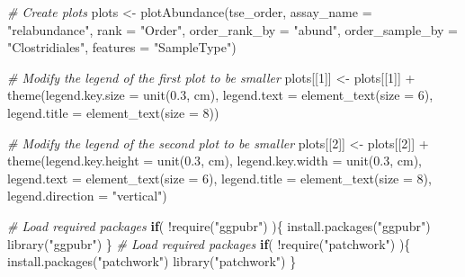 \documentclass[
]{book}
\newenvironment{Shaded}{\begin{snugshade}}{\end{snugshade}}
\newcommand{\AttributeTok}[1]{\textcolor[rgb]{0.77,0.63,0.00}{#1}}
\newcommand{\CommentTok}[1]{\textcolor[rgb]{0.56,0.35,0.01}{\textit{#1}}}
\newcommand{\ControlFlowTok}[1]{\textcolor[rgb]{0.13,0.29,0.53}{\textbf{#1}}}
\newcommand{\DecValTok}[1]{\textcolor[rgb]{0.00,0.00,0.81}{#1}}
\newcommand{\FloatTok}[1]{\textcolor[rgb]{0.00,0.00,0.81}{#1}}
\newcommand{\FunctionTok}[1]{\textcolor[rgb]{0.00,0.00,0.00}{#1}}
\newcommand{\NormalTok}[1]{#1}
\newcommand{\OtherTok}[1]{\textcolor[rgb]{0.56,0.35,0.01}{#1}}
\newcommand{\SpecialCharTok}[1]{\textcolor[rgb]{0.00,0.00,0.00}{#1}}
\newcommand{\StringTok}[1]{\textcolor[rgb]{0.31,0.60,0.02}{#1}}
\begin{document}
\begin{Shaded}
\begin{Highlighting}[]
\CommentTok{\# Create plots}
\NormalTok{plots }\OtherTok{\textless{}{-}} \FunctionTok{plotAbundance}\NormalTok{(tse\_order, }\AttributeTok{assay\_name =} \StringTok{"relabundance"}\NormalTok{, }\AttributeTok{rank =} \StringTok{"Order"}\NormalTok{,}
                       \AttributeTok{order\_rank\_by =} \StringTok{"abund"}\NormalTok{, }\AttributeTok{order\_sample\_by =} \StringTok{"Clostridiales"}\NormalTok{,}
                       \AttributeTok{features =} \StringTok{"SampleType"}\NormalTok{)}

\CommentTok{\# Modify the legend of the first plot to be smaller }
\NormalTok{plots[[}\DecValTok{1}\NormalTok{]] }\OtherTok{\textless{}{-}}\NormalTok{ plots[[}\DecValTok{1}\NormalTok{]] }\SpecialCharTok{+}
    \FunctionTok{theme}\NormalTok{(}\AttributeTok{legend.key.size =} \FunctionTok{unit}\NormalTok{(}\FloatTok{0.3}\NormalTok{, }\StringTok{\textquotesingle{}cm\textquotesingle{}}\NormalTok{),}
          \AttributeTok{legend.text =} \FunctionTok{element\_text}\NormalTok{(}\AttributeTok{size =} \DecValTok{6}\NormalTok{),}
          \AttributeTok{legend.title =} \FunctionTok{element\_text}\NormalTok{(}\AttributeTok{size =} \DecValTok{8}\NormalTok{))}

\CommentTok{\# Modify the legend of the second plot to be smaller }
\NormalTok{plots[[}\DecValTok{2}\NormalTok{]] }\OtherTok{\textless{}{-}}\NormalTok{ plots[[}\DecValTok{2}\NormalTok{]] }\SpecialCharTok{+}
    \FunctionTok{theme}\NormalTok{(}\AttributeTok{legend.key.height =} \FunctionTok{unit}\NormalTok{(}\FloatTok{0.3}\NormalTok{, }\StringTok{\textquotesingle{}cm\textquotesingle{}}\NormalTok{),}
          \AttributeTok{legend.key.width =} \FunctionTok{unit}\NormalTok{(}\FloatTok{0.3}\NormalTok{, }\StringTok{\textquotesingle{}cm\textquotesingle{}}\NormalTok{),}
          \AttributeTok{legend.text =} \FunctionTok{element\_text}\NormalTok{(}\AttributeTok{size =} \DecValTok{6}\NormalTok{),}
          \AttributeTok{legend.title =} \FunctionTok{element\_text}\NormalTok{(}\AttributeTok{size =} \DecValTok{8}\NormalTok{),}
          \AttributeTok{legend.direction =} \StringTok{"vertical"}\NormalTok{)}

\CommentTok{\# Load required packages}
\ControlFlowTok{if}\NormalTok{( }\SpecialCharTok{!}\FunctionTok{require}\NormalTok{(}\StringTok{"ggpubr"}\NormalTok{) )\{}
    \FunctionTok{install.packages}\NormalTok{(}\StringTok{"ggpubr"}\NormalTok{)}
    \FunctionTok{library}\NormalTok{(}\StringTok{"ggpubr"}\NormalTok{)}
\NormalTok{\}}
\CommentTok{\# Load required packages}
\ControlFlowTok{if}\NormalTok{( }\SpecialCharTok{!}\FunctionTok{require}\NormalTok{(}\StringTok{"patchwork"}\NormalTok{) )\{}
    \FunctionTok{install.packages}\NormalTok{(}\StringTok{"patchwork"}\NormalTok{)}
    \FunctionTok{library}\NormalTok{(}\StringTok{"patchwork"}\NormalTok{)}
\NormalTok{\}}


\end{Highlighting}
\end{Shaded}
\end{document}

